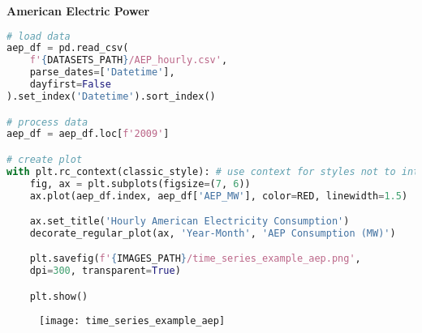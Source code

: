 {\noindent\hspace{-12.5pt}\normalsize\bfseries American Electric Power}\vspace{-10pt}
\begin{center}
  \begin{lstlisting}[language=Python, 
  caption={Ежечасовое потребление электричества в Америке.}, 
  label={lst:time_series_example_aep}]
# load data
aep_df = pd.read_csv(
    f'{DATASETS_PATH}/AEP_hourly.csv',
    parse_dates=['Datetime'],
    dayfirst=False
).set_index('Datetime').sort_index()

# process data
aep_df = aep_df.loc[f'2009']

# create plot
with plt.rc_context(classic_style): # use context for styles not to interfere
    fig, ax = plt.subplots(figsize=(7, 6))
    ax.plot(aep_df.index, aep_df['AEP_MW'], color=RED, linewidth=1.5)

    ax.set_title('Hourly American Electricity Consumption')
    decorate_regular_plot(ax, 'Year-Month', 'AEP Consumption (MW)')

    plt.savefig(f'{IMAGES_PATH}/time_series_example_aep.png', 
    dpi=300, transparent=True)

    plt.show()
  \end{lstlisting}
\end{center}

\begin{figure}[h!]
  \centering
  \texttt{[image: time\_series\_example\_aep]}
\end{figure}\newpage


